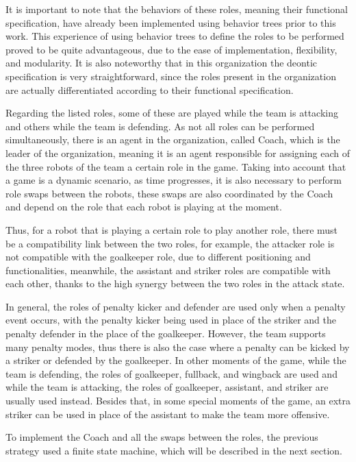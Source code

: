 It is important to note that the behaviors of these roles, meaning their functional specification, have already been implemented using behavior trees prior to this work. This experience of using behavior trees to define the roles to be performed proved to be quite advantageous, due to the ease of implementation, flexibility, and modularity. It is also noteworthy that in this organization the deontic specification is very straightforward, since the roles present in the organization are actually differentiated according to their functional specification.

Regarding the listed roles, some of these are played while the team is attacking and others while the team is defending. As not all roles can be performed simultaneously, there is an agent in the organization, called Coach, which is the leader of the organization, meaning it is an agent responsible for assigning each of the three robots of the team a certain role in the game. Taking into account that a game is a dynamic scenario, as time progresses, it is also necessary to perform role swaps between the robots, these swaps are also coordinated by the Coach and depend on the role that each robot is playing at the moment.

Thus, for a robot that is playing a certain role to play another role, there must be a compatibility link between the two roles, for example, the attacker role is not compatible with the goalkeeper role, due to different positioning and functionalities, meanwhile, the assistant and striker roles are compatible with each other, thanks to the high synergy between the two roles in the attack state.

In general, the roles of penalty kicker and defender are used only when a penalty event occurs, with the penalty kicker being used in place of the striker and the penalty defender in the place of the goalkeeper. However, the team supports many penalty modes, thus there is also the case where a penalty can be kicked by a striker or defended by the goalkeeper. In other moments of the game, while the team is defending, the roles of goalkeeper, fullback, and wingback are used and while the team is attacking, the roles of goalkeeper, assistant, and striker are usually used instead. Besides that, in some special moments of the game, an extra striker can be used in place of the assistant to make the team more offensive.

To implement the Coach and all the swaps between the roles, the previous strategy used a finite state machine, which will be described in the next section. 

